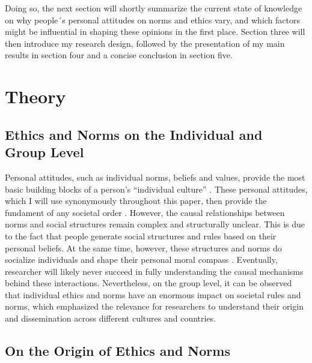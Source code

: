 \documentclass{article}[hidelinks]
\begin{document}
Doing so, the next section will shortly summarize the current state of knowledge on why people´s personal attitudes on norms and ethics vary, and which factors might be influential in shaping these opinions in the first place. Section three will then introduce my research design, followed by the presentation of my main results in section four and a concise conclusion in section five.

\section{Theory}
\subsection{Ethics and Norms on the Individual and Group Level}

Personal attitudes, such as individual norms, beliefs and values, provide the most basic building blocks of a person’s “individual culture” \cite[~p.194]{Chai.2009}. These personal attitudes, which I will use synonymously throughout this paper, then provide the fundament of any societal order \citep{Jelen.2003}. However, the causal relationships between norms and social structures remain complex and structurally unclear. This is due to the fact that people generate social structures and rules based on their personal beliefs. At the same time, however, these structures and norms do socialize individuals and shape their personal moral compass \citep{Chai.2009}. 
Eventually, researcher will likely never succeed in fully understanding the causal mechanisms behind these interactions. Nevertheless, on the group level, it can be observed that individual ethics and norms have an enormous impact on societal rules and norms, which emphasized the relevance for researchers to understand their origin and dissemination across different cultures and countries. 

\bigskip
\subsection{On the Origin of Ethics and Norms}
\end{document}
